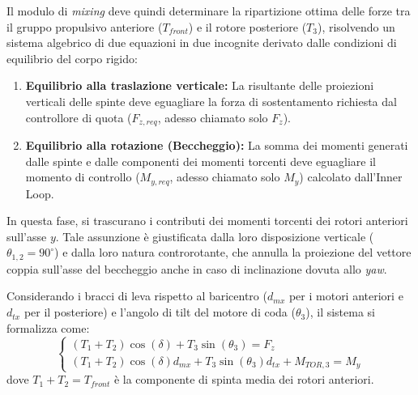 Il modulo di \textit{mixing} deve quindi determinare la ripartizione ottima delle forze tra il gruppo propulsivo anteriore ($T_{front}$) e il rotore posteriore ($T_{3}$), risolvendo un sistema algebrico di due equazioni in due incognite derivato dalle condizioni di equilibrio del corpo rigido:
\begin{enumerate}
    \item \textbf{Equilibrio alla traslazione verticale:} La risultante delle proiezioni verticali delle spinte deve eguagliare la forza di sostentamento richiesta dal controllore di quota ($F_{z,req}$, adesso chiamato solo $F_z$).
    \item \textbf{Equilibrio alla rotazione (Beccheggio):} La somma dei momenti generati dalle spinte e dalle componenti dei momenti torcenti deve eguagliare il momento di controllo ($M_{y,req}$, adesso chiamato solo $M_y$) calcolato dall'Inner Loop.
\end{enumerate}
In questa fase, si trascurano i contributi dei momenti torcenti dei rotori anteriori sull'asse $y$. Tale assunzione è giustificata dalla loro disposizione verticale ($\theta_{1,2} = 90^\circ$) e dalla loro natura controrotante, che annulla la proiezione del vettore coppia sull'asse del beccheggio anche in caso di inclinazione dovuta allo \textit{yaw}. 

Considerando i bracci di leva rispetto al baricentro ($d_{mx}$ per i motori anteriori e $d_{tx}$ per il posteriore) e l'angolo di tilt del motore di coda ($\theta_3$), il sistema si formalizza come:
\begin{equation}
    \begin{cases}
    (T_1 + T_2) \cos(\delta) + T_3 \sin(\theta_{3}) = F_{z} \\
    (T_1 + T_2) \cos(\delta) d_{mx} + T_3 \sin(\theta_{3}) d_{tx} + M_{TOR,3} = M_y
    \end{cases}
\end{equation}
dove $T_1 + T_2 = T_{front}$ è la componente di spinta media dei rotori anteriori.

